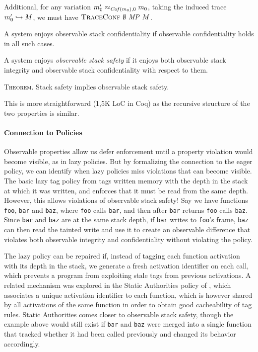 \documentclass[acmsmall,review,anonymous]{acmart}\settopmatter{printfolios=true,printccs=false,printacmref=false}
\begin{document}
{      Additional, for any variation \(m_0' \approx_{\mathit{Cof}(m_0),0}
      m_0\), taking the induced trace  \(m_0' \hookrightarrow
      M\), we must have \(\text{\sc TraceConf} ~ \emptyset ~ \mathit{MP} ~ M\).

      A system enjoys observable stack confidentiality if observable
      confidentiality holds in all such cases.

    A system enjoys {\em observable stack safety}
    if it enjoys both observable stack integrity and
      observable stack confidentiality with respect to them.

      \medskip
      \textsc{Theorem.}
      Stack safety implies observable stack safety.
      \smallskip

      This is more straightforward  (1,5K LoC in Coq) as the recursive
      structure of the two properties is similar.

    \paragraph{Connection to Policies}

    Observable properties allow us defer enforcement until a property
    violation would become visible, as in lazy policies. But by formalizing
    the connection to the eager policy, we can identify when lazy policies
    miss violations that can become visible. The basic lazy tag policy from
    \citet{DBLP:conf/sp/RoesslerD18} tags written memory with the depth in the
    stack at which it was written, and enforces that it must be read from the
    same depth. However, this allows violations of observable stack safety!
    Say we have functions {\tt foo}, {\tt bar} and {\tt baz}, where {\tt foo}
    calls {\tt bar}, and then after {\tt bar} returns {\tt foo} calls
    {\tt baz}. Since {\tt bar} and {\tt baz} are at the same stack depth, if
    {\tt bar} writes to {\tt foo}'s frame, {\tt baz} can then read the tainted
    write and use it to create an observable difference that violates both
    observable integrity and confidentiality without violating the policy.

    The lazy policy can be repaired if, instead of tagging each function
    activation with its depth in the stack, we generate a fresh activation
    identifier on each call, which prevents a program from exploiting stale
    tags from previous activations. A related mechanism was explored in the
    Static Authorities policy of \citet{DBLP:conf/sp/RoesslerD18}, which
    associates a unique activation identifier to each function, which is
    however shared by all activations of the same function in order to obtain
    good cacheability of tag rules. Static Authorities comes closer to
    observable stack safety, though the example above would still exist
    if {\tt bar} and {\tt baz} were merged into a single function that tracked
    whether it had been called previously and changed its behavior accordingly.


}
\end{document}
